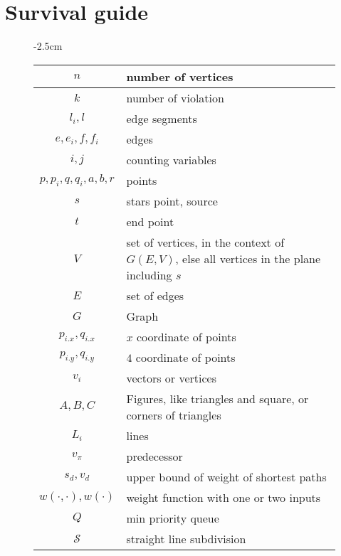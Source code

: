 \chapter{Survival guide}

\begin{figure}
\begin{center}
    \addtolength{\leftskip} {-2.5cm} %
    \addtolength{\rightskip}{-2.5cm}
\begin{tabular}{| c | l |}
	\hline
	$n$ & number of vertices \\
	\hline
	$k$ & number of violation \\
	\hline
	$l_i,l$ & edge segments \\
	\hline
	$e,e_i,f,f_i$ & edges \\
	\hline
	$i,j$ & counting variables \\
	\hline
	$p,p_i,q,q_i,a,b,r$ & points \\
	\hline
	$s$ & stars point, source \\
	\hline
	$t$ & end point \\
	\hline
	$V$ & set of vertices, in the context of $G(E,V)$, else all vertices in the plane including $s$\\
	\hline
	$E$ & set of edges \\
	\hline
	$G$ & Graph \\
	\hline
	$p_{i.x}, q_{i.x}$ & $x$ coordinate of points \\
	\hline
	$p_{i.y}, q_{i.y}$ & $4$ coordinate of points\\
	\hline
	$v_i$ & vectors or vertices \\
	\hline
	$A,B,C$ & Figures, like triangles and square, or corners of triangles \\
	\hline
	$L_i$ & lines \\
	\hline
	$v_{\pi}$ & predecessor \\
	\hline
	$s_d, v_d$ & upper bound of weight of shortest paths \\
	\hline
	$w(\cdot, \cdot), w(\cdot)$ & weight function with one or two inputs \\
	\hline
	$Q$ & min priority queue \\
	\hline
	$\mathcal{S}$ & straight line subdivision \\
	\hline
\end{tabular}
\end{center}
\end{figure}


